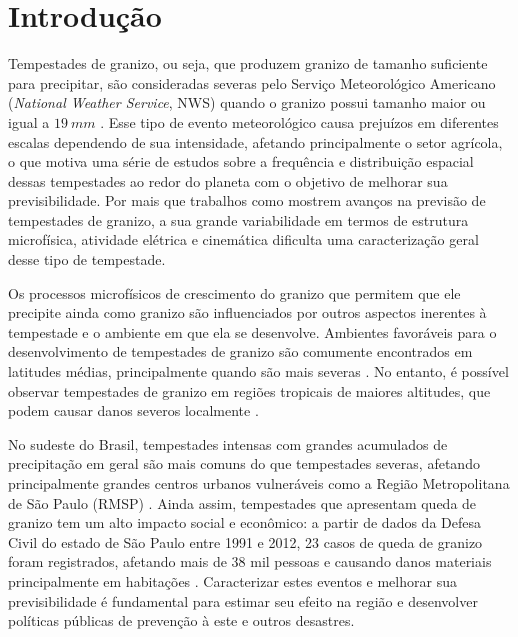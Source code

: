 \chapter{Introdução}

Tempestades de granizo, ou seja, que produzem granizo de tamanho suficiente para precipitar, são consideradas severas pelo Serviço Meteorológico Americano (\textit{National Weather Service}, NWS) quando o granizo possui tamanho maior ou igual a $19\:mm$ \cite{Moller2001c}. Esse tipo de evento meteorológico causa prejuízos em diferentes escalas dependendo de sua intensidade, afetando principalmente o setor agrícola, o que motiva uma série de estudos sobre a frequência e distribuição espacial dessas tempestades ao redor do planeta \cite{Dessens1994, Knight2001, Eccel2012, Berthet2013, Baldi2014, Jin2017, Martins2017} com o objetivo de melhorar sua previsibilidade. Por mais que trabalhos como  mostrem avanços na previsão de tempestades de granizo, a sua grande variabilidade em termos de estrutura microfísica, atividade elétrica e cinemática dificulta uma caracterização geral desse tipo de tempestade.

Os processos microfísicos de crescimento do granizo que permitem que ele precipite ainda como granizo são influenciados por outros aspectos inerentes à tempestade e o ambiente em que ela se desenvolve. Ambientes favoráveis para o desenvolvimento de tempestades de granizo são comumente encontrados em latitudes médias, principalmente quando são mais severas \cite{Court1982}. No entanto, é possível observar tempestades de granizo em regiões tropicais de maiores altitudes, que podem causar danos severos localmente \cite{Morgan1976}.

No sudeste do Brasil, tempestades intensas com grandes acumulados de precipitação em geral são mais comuns do que tempestades severas, afetando principalmente grandes centros urbanos vulneráveis como a Região Metropolitana de São Paulo (RMSP) \cite{Vemado2016}. Ainda assim, tempestades que apresentam queda de granizo tem um alto impacto social e econômico: a partir de dados da Defesa Civil do estado de São Paulo entre 1991 e 2012, 23 casos de queda de granizo foram registrados, afetando mais de 38 mil pessoas e causando danos materiais principalmente em habitações \cite{Ceped2012}. Caracterizar estes eventos e melhorar sua previsibilidade é fundamental para estimar seu efeito na região e desenvolver políticas públicas de prevenção à este e outros desastres.

